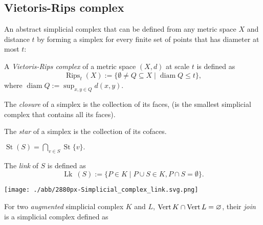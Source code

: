 \begin{multicols*}{3}
\subsection{Vietoris-Rips complex}
{\myfont An abstract simplicial complex that can be defined from any metric space $X$ and distance $t$ by forming a simplex for every finite set of points that has diameter at most $t$:}
\vspace{-0.4pc}
\begin{definition}
A \emph{Vietoris-Rips complex} of a metric space $(X,d)$ at scale $t$ is defined as 
\begin{equation*}
\operatorname{Rips}_t(X):= \{ \emptyset \neq Q \subseteq X \mid \operatorname{diam} Q \leq t \},
\end{equation*}
where $\operatorname{diam} Q := \sup_{x,y \in Q} d(x,y)$.
\end{definition}
\rspace\drawaline
\vspace{-1.5pc}
\begin{defi}[Closure]
The \emph{closure} of a  simplex is the collection of its faces, (is the smallest simplicial complex that contains all its faces).
\end{defi}
\rspace
\begin{defi}[Star]
The \emph{star} of a simplex is the collection of its cofaces.
\end{defi}
\rspace
\begin{rem}
$\operatorname{St}(S) = \bigcap_{v \in S} \operatorname{St} \{v\}.$
\end{rem}
\rspace
\begin{defi}[Link] The \emph{link} of $S$ is defined as  \vspace{-0.4pc}
$$\operatorname{Lk} \ (S) := \{P \in K \mid P\cup S \in K , P \cap S = \emptyset\}.$$
\begin{center}
\texttt{[image: ./abb/2880px-Simplicial\_complex\_link.svg.png]}
\end{center}
\end{defi}
\rspace
\begin{definition}[Join]
For two \emph{augmented} simplicial complex $K$ and $L$, $\operatorname{Vert} K \cap \operatorname{Vert} L = \varnothing$, their \emph{join} is a simplicial complex defined as
\begin{equation*}

\end{equation*}
\end{definition}
\end{multicols*}
